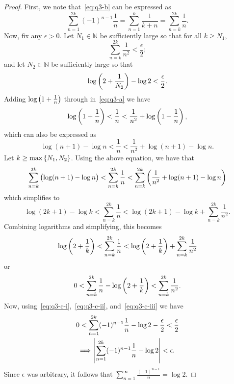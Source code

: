 \documentclass{article}
\newcommand{\N}{\mathbb{N}}
\begin{document}
\begin{proof}

First, we note that~\eqref{eq:q3-b} can be expressed as
%
\begin{equation}
    \sum_{n = 1}^{2 k} (-1)^{n - 1} \frac{1}{n}
    = \sum_{n = 1}^{k} \frac{1}{k + n}
    = \sum_{n = k}^{2 k} \frac{1}{n}
    \label{eq:q3-c-i}
    .
\end{equation}
%
Now, fix any $\epsilon > 0$. Let $N_1 \in \N$ be sufficiently large so
that for all $k \geq N_1$,
%
\begin{equation}
    \sum_{n = k}^{2k} \frac{1}{n^2} < \frac{\epsilon}{2}
    \label{eq:q3-c-ii}
    ;
\end{equation}
%
and let $N_2 \in \N$ be sufficiently large so that
%
\begin{equation}
    \log\del{2 + \frac{1}{N_2}} - \log 2 < \frac{\epsilon}{2}
    \label{eq:q3-c-iii}
    .
\end{equation}
%
Adding $\log\del{1 + \frac{1}{n}}$ through in~\eqref{eq:q3-a} we have
%
\begin{equation*}
    \log\del{1 + \frac{1}{n}} < \frac{1}{n} < \frac{1}{n^2} + \log\del{1 + \frac{1}{n}}
    ,
\end{equation*}
%
which can also be expressed as
%
\begin{equation*}
    \log(n + 1) - \log n < \frac{1}{n} < \frac{1}{n^2} + \log(n + 1) - \log n
    .
\end{equation*}
%
Let $k \geq \max\cbr{N_1, N_2}$. Using the above equation, we have that
%
\begin{equation*}
    \sum_{n = k}^{2k} \del{\log(n + 1) - \log n}
    < \sum_{n = k}^{2k} \frac{1}{n}
    < \sum_{n = k}^{2k} \del{\frac{1}{n^2} + \log(n + 1) - \log n}
\end{equation*}
%
which simplifies to
%
\begin{equation*}
    \log(2k + 1) - \log k
    < \sum_{n = k}^{2k} \frac{1}{n}
    < \log(2k + 1) - \log k + \sum_{n = k}^{2k} \frac{1}{n^2}
    .
\end{equation*}
%
Combining logarithms and simplifying, this becomes
%
\begin{equation*}
    \log\del{2 + \frac{1}{k}}
    < \sum_{n = k}^{2k} \frac{1}{n}
    < \log\del{2 + \frac{1}{k}} + \sum_{n = k}^{2k} \frac{1}{n^2}
\end{equation*}
%
or
%
\begin{equation*}
    0
    < \sum_{n = k}^{2k} \frac{1}{n} - \log\del{2 + \frac{1}{k}}
    < \sum_{n = k}^{2k} \frac{1}{n^2}
    .
\end{equation*}
%
Now, using~\eqref{eq:q3-c-i},~\eqref{eq:q3-c-ii}, and~\eqref{eq:q3-c-iii} we have
%
\begin{align*}
    &0
    < \sum_{n = 1}^{2k} (-1)^{n - 1} \frac{1}{n} - \log 2 - \frac{\epsilon}{2}
    < \frac{\epsilon}{2} \\
    &\implies \envert{\sum_{n = 1}^{2k} (-1)^{n - 1} \frac{1}{n} - \log 2} < \epsilon
    .
\end{align*}
%
Since $\epsilon$ was arbitrary, it follows that $\sum_{n = 1}^\infty
\frac{(-1)^{n - 1}}{n} = \log 2$.

\end{proof}
\end{document}
